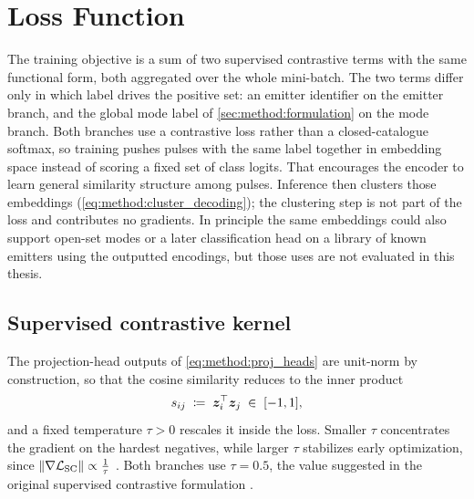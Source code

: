 \section{Loss Function}\label{sec:method:loss}

The training objective is a sum of two supervised contrastive \parencite{khosla2020supcon} terms with the same functional form, both aggregated over the whole mini-batch.
The two terms differ only in which label drives the positive set: an emitter identifier on the emitter branch, and the global mode label of \cref{sec:method:formulation} on the mode branch.
Both branches use a contrastive loss rather than a closed-catalogue softmax, so training pushes pulses with the same label together in embedding space instead of scoring a fixed set of class logits.
That encourages the encoder to learn general similarity structure among pulses.
Inference then clusters those embeddings (\cref{eq:method:cluster_decoding}); the clustering step is not part of the loss and contributes no gradients.
In principle the same embeddings could also support open-set modes or a later classification head on a library of known emitters using the outputted encodings, but those uses are not evaluated in this thesis.

\subsection*{Supervised contrastive kernel}

The projection-head outputs of \cref{eq:method:proj_heads} are unit-norm by construction, so that the cosine similarity reduces to the inner product
\begin{equation}\label{eq:method:sim}
  s_{ij} \;\coloneqq\; \bm{z}_i^{\top}\bm{z}_j \;\in\; [-1,1],
\end{equation}
and a fixed temperature $\tau > 0$ rescales it inside the loss.
Smaller $\tau$ concentrates the gradient on the hardest negatives, while larger $\tau$ stabilizes early optimization, since $\|\nabla \mathcal{L}_{\mathrm{SC}}\| \propto \frac{1}{\tau}$
\parencite{khosla2020supcon}.
Both branches use $\tau = 0.5$, the value suggested in the original supervised contrastive formulation \parencite{khosla2020supcon}.

